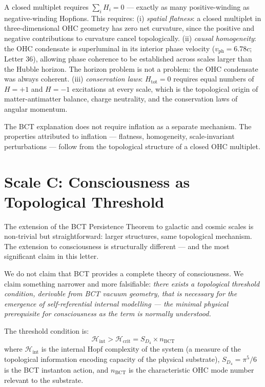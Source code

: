\documentclass[aps,prl,twocolumn,superscriptaddress,floatfix]{revtex4-2}
\begin{document}
A closed multiplet requires $\sum_i H_i = 0$ --- exactly as
many positive-winding as negative-winding Hopfions.
This requires:
(i) \textit{spatial flatness}: a closed multiplet in
three-dimensional OHC geometry has zero net curvature, since
the positive and negative contributions to curvature cancel
topologically.
(ii) \textit{causal homogeneity}: the OHC condensate is
superluminal in its interior phase velocity
($v_\mathrm{ph} = 6.78c$; Letter 36), allowing phase
coherence to be established across scales larger than the
Hubble horizon. The horizon problem is not a problem: the
OHC condensate was always coherent.
(iii) \textit{conservation laws}: $H_\mathrm{tot} = 0$ requires
equal numbers of $H = +1$ and $H = -1$ excitations at every
scale, which is the topological origin of matter-antimatter
balance, charge neutrality, and the conservation laws of
angular momentum.

The BCT explanation does not require inflation as a separate
mechanism. The properties attributed to inflation --- flatness,
homogeneity, scale-invariant perturbations --- follow from the
topological structure of a closed OHC multiplet.

\section{Scale C: Consciousness as Topological Threshold}

The extension of the BCT Persistence Theorem to galactic and
cosmic scales is non-trivial but straightforward: larger
structures, same topological mechanism. The extension to
consciousness is structurally different --- and the most
significant claim in this letter.

We do not claim that BCT provides a complete theory of
consciousness. We claim something narrower and more
falsifiable: \textit{there exists a topological threshold
condition, derivable from BCT vacuum geometry, that is
necessary for the emergence of self-referential internal
modelling --- the minimal physical prerequisite for
consciousness as the term is normally understood.}

The threshold condition is:
\begin{equation}
  \mathcal{H}_\mathrm{int} > \mathcal{H}_\mathrm{crit}
  = S_{D_4} \times n_\mathrm{BCT}
  \label{eq:crit}
\end{equation}
where $\mathcal{H}_\mathrm{int}$ is the internal Hopf complexity
of the system (a measure of the topological information
encoding capacity of the physical substrate), $S_{D_4} = \pi^5/6$
is the BCT instanton action, and $n_\mathrm{BCT}$ is the
characteristic OHC mode number relevant to the substrate.
\end{document}
